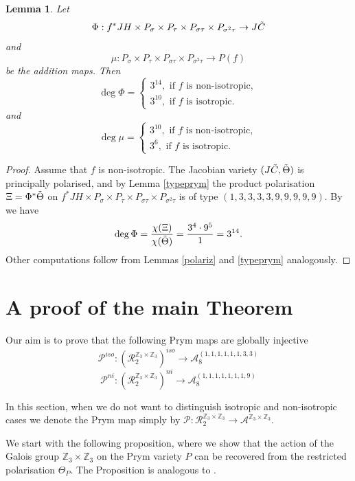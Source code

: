 \documentclass{amsart}
\newtheorem{lem}[thm]{Lemma}
\theoremstyle{remark}
\numberwithin{equation}{section}
\newcommand{\cA}{\mathcal{A}}
\newcommand{\tC}{\Tilde{C}}
\newcommand{\s}{\sigma}
\begin{document}
\begin{lem}
\label{degree}
     Let $$\Phi: f^*JH \times P_{\s} \times P_{\tau} \times P_{\s\tau} \times P_{\s^2\tau} \to J\tC$$ and $$\mu: P_{\s} \times P_{\tau} \times P_{\s\tau} \times P_{\s^2\tau} \to P(f)$$ be the addition maps. Then $$\deg \Phi = \begin{cases}
         3^{14}, \text{ if $f$ is non-isotropic}, \\
         3^{10}, \text{ if $f$ is isotropic.}
     \end{cases}$$ and $$\deg \mu = \begin{cases}
         3^{10}, \text{ if $f$ is non-isotropic}, \\
         3^{6}, \text{ if $f$ is isotropic.}
     \end{cases}$$
\end{lem}

\begin{proof}
     Assume that $f$ is non-isotropic. The Jacobian variety $(J\tC, \Tilde{\Theta})$ is principally polarised, and by Lemma \ref{typeprym} the product polarisation $\Xi = \Phi^*\Tilde{\Theta}$ on $f^*JH \times P_{\s} \times P_{\tau} \times P_{\s\tau} \times P_{\s^2\tau}$ is of type $(1,3,3,3,3,9,9,9,9,9)$. By \cite[Cor 3.6.6]{BL} we have $$\deg \Phi = \frac{\chi(\Xi)}{\chi(\Tilde{\Theta})} = \frac{3^4\cdot 9^5}{1} = 3^{14}.$$
     Other computations follow from Lemmas \ref{polariz} and \ref{typeprym} analogously. 
\end{proof}

\section{A proof of the main Theorem}

Our aim is to prove that the following Prym maps are globally injective $$\mathcal{P}^{iso}:(\mathcal{R}_2^{\mathbb{Z}_3\times \mathbb{Z}_3})^{iso} \to \cA^{(1,1,1,1,1,1,3,3)}_8$$ 
$$\mathcal{P}^{ni}:(\mathcal{R}_2^{\mathbb{Z}_3\times \mathbb{Z}_3})^{ni} \to\cA^{(1,1,1,1,1,1,1,9)}_8$$


In this section, when we do not want to distinguish isotropic and non-isotropic cases we denote the Prym map simply by $\mathcal{P}:\mathcal{R}_2^{\mathbb{Z}_3\times\mathbb{Z}_3} \to \mathcal{A}^{\mathbb{Z}_3\times\mathbb{Z}_3}$.

We start with the following proposition, where we show that the action of the Galois group $\mathbb{Z}_3 \times \mathbb{Z}_3$ on the Prym variety $P$ can be recovered from the restricted polarisation $\Theta_P$. The Proposition is analogous to \cite[Proposition 3.1]{sophie}. 
\end{document}
